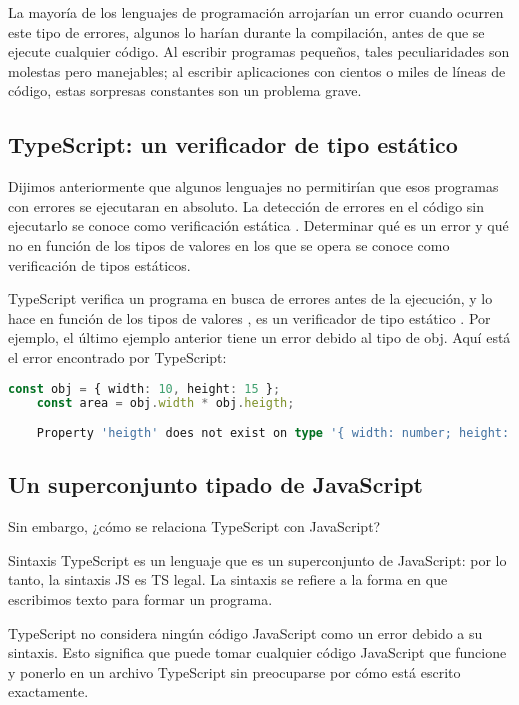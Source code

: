 \begin{enumerate}
La mayoría de los lenguajes de programación arrojarían un error cuando ocurren este tipo de errores, algunos lo harían durante la compilación, antes de que se ejecute cualquier código. Al escribir programas pequeños, tales peculiaridades son molestas pero manejables; al escribir aplicaciones con cientos o miles de líneas de código, estas sorpresas constantes son un problema grave.

\subsection{TypeScript: un verificador de tipo estático}

Dijimos anteriormente que algunos lenguajes no permitirían que esos programas con errores se ejecutaran en absoluto. La detección de errores en el código sin ejecutarlo se conoce como verificación estática . Determinar qué es un error y qué no en función de los tipos de valores en los que se opera se conoce como verificación de tipos estáticos.

TypeScript verifica un programa en busca de errores antes de la ejecución, y lo hace en función de los tipos de valores , es un verificador de tipo estático . Por ejemplo, el último ejemplo anterior tiene un error debido al tipo de obj. Aquí está el error encontrado por TypeScript:

\begin{lstlisting}[language=typescript]
	const obj = { width: 10, height: 15 };
	const area = obj.width * obj.heigth;
	
	Property 'heigth' does not exist on type '{ width: number; height: number; }'. Did you mean 'height'?
\end{lstlisting}



\subsection{Un superconjunto tipado de JavaScript}

Sin embargo, ¿cómo se relaciona TypeScript con JavaScript?

Sintaxis
TypeScript es un lenguaje que es un superconjunto de JavaScript: por lo tanto, la sintaxis JS es TS legal. La sintaxis se refiere a la forma en que escribimos texto para formar un programa.

TypeScript no considera ningún código JavaScript como un error debido a su sintaxis. Esto significa que puede tomar cualquier código JavaScript que funcione y ponerlo en un archivo TypeScript sin preocuparse por cómo está escrito exactamente.


\end{enumerate}
